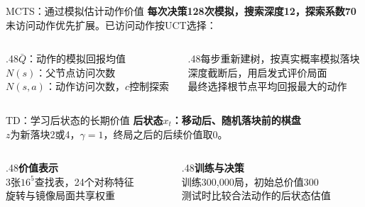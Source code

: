 \documentclass[11pt]{beamer}
\newcommand{\smalltext}{\fontsize{9pt}{12pt}\selectfont}
\begin{document}
\begin{frame}{MCTS：通过模拟估计动作价值}
\textbf{每次决策128次模拟，搜索深度12，探索系数70}\\[2mm]
\smalltext 未访问动作优先扩展。已访问动作按UCT选择：
{\large\[\]}
\begin{columns}[T,onlytextwidth]
\begin{column}{.48\textwidth}\smalltext $\bar Q$：动作的模拟回报均值\\[1.5mm]$N(s)$：父节点访问次数\\[1.5mm]$N(s,a)$：动作访问次数，$c$控制探索\end{column}
\begin{column}{.48\textwidth}\smalltext 每步重新建树，按真实概率模拟落块\\[1.5mm]深度截断后，用启发式评价局面\\[1.5mm]最终选择根节点平均回报最大的动作\end{column}
\end{columns}
\end{frame}
\begin{frame}{TD：学习后状态的长期价值}
\textbf{后状态$x_t$：移动后、随机落块前的棋盘}
{\large\[\]}
\smalltext $z$为新落块2或4，$\gamma=1$，终局之后的后续价值取0。\\[5mm]
\begin{columns}[T,onlytextwidth]
\begin{column}{.48\textwidth}\textbf{价值表示}\\[2mm]3张$16^5$查找表，24个对称特征\\[2mm]旋转与镜像局面共享权重\end{column}
\begin{column}{.48\textwidth}\textbf{训练与决策}\\[2mm]训练300,000局，初始总价值300\\[2mm]测试时比较合法动作的后状态估值\end{column}
\end{columns}
\end{frame}
\end{document}
